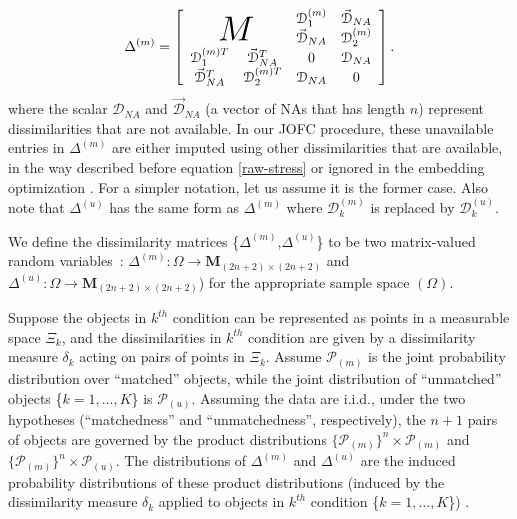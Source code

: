 \documentclass[12pt]{article} %
\newenvironment{remark}[1][Remark]{\begin{trivlist}
\item[\hskip \labelsep {\bfseries #1}]}{\end{trivlist}}
\begin{document}
 \begin{equation}
\Delta^{(m)}=  \left[ \begin{array}{cccc}
          \multicolumn{2}{c}{\multirow{2}{*}{\Huge{$M$}}} &  \mathcal{D}_1^{(m)} &\vec{\mathcal{D}}_{NA}\\
        & &  \vec{\mathcal{D}}_{NA}   & \mathcal{D}_2^{(m)} \\
				\mathcal{D}_1^{(m)T} & \vec{\mathcal{D}}_{NA}^T  &  0 & \mathcal{D}_{NA} \\
         \vec{\mathcal{D}}_{NA}^T & \mathcal{D}_2^{(m)T} & \mathcal{D}_{NA} &0\\
     \end{array}  \right].     \label{aug_omnibus} 
\end{equation}  where
the scalar $\mathcal{D}_{NA}$ and    $\vec{\mathcal{D}}_{NA}$ (a vector of NAs that has length $n$)   represent dissimilarities that are not available. 
In our JOFC procedure, these unavailable entries in $\Delta^{(m)}$ are either imputed using other dissimilarities that are available, in the way described before equation \eqref{raw-stress} or ignored in the embedding optimization . For a simpler  notation, let us assume it is the former case. Also note that $\Delta^{(u)}$  has the same form as $\Delta^{(m)}$ where $\mathcal{D}_k^{(m)}$ is replaced by $\mathcal{D}_k^{(u)}$.

We define the dissimilarity matrices \{$\Delta^{(m)}$,$\Delta^{(u)}$\} to be  two matrix-valued random variables~: $\Delta^{(m)}:\Omega \rightarrow \mathbf{M}_{(2n+2)\times (2n+2)} $ and  $\Delta^{(u)}:\Omega \rightarrow \mathbf{M}_{(2n+2)\times (2n+2)} $) for the appropriate sample  space $(\Omega)$.
\begin{remark}
Suppose the objects in $k^{th}$  condition  can be represented as points in a measurable space $\Xi_k$, and the dissimilarities in $k^{th}$ condition are given by  a dissimilarity measure $\delta_k$ acting on pairs of points in $\Xi_k$. Assume $\mathcal{P}_{(m)}$ is the joint probability distribution over ``matched'' objects, while the joint distribution of ``unmatched'' objects \{$k=1,\ldots,K$\}  is $\mathcal{P}_{(u)}$. Assuming the data are i.i.d., under the two hypotheses (``matchedness'' and ``unmatchedness'', respectively), the $n+1$ pairs of objects are governed  by the product distributions $\{\mathcal{P}_{(m)}\}^n \times \mathcal{P}_{(m)} $ and $\{\mathcal{P}_{(m)}\}^n \times \mathcal{P}_{(u)} $.  The distributions of $\Delta^{(m)}$ and $\Delta^{(u)}$ are the induced probability distributions of  these product distributions (induced by the  dissimilarity measure $\delta_k$ applied to  objects in $k^{th}$ condition \{$k=1,\ldots,K$\})  .
\end{remark}
\end{document}
